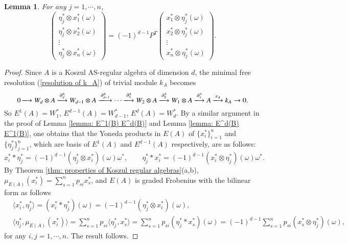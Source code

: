 \documentclass[a4paper,10pt]{amsart}
\newtheorem{lemma}[theorem]{Lemma}
\theoremstyle{definition}
\numberwithin{equation}{section}
\begin{document}
\begin{lemma}\label{lemma: Yoneda product in E(A)}
For any $j=1,\cdots,n$,
$$
\left(
\begin{array}{c}
\eta_j^*\otimes x^*_1(\omega)\\
\eta_j^*\otimes x^*_2(\omega)\\
\vdots\\
\eta_j^*\otimes x^*_n(\omega)
\end{array}
\right)
=(-1)^{d-1}P^T\left(
\begin{array}{c}
 x^*_1\otimes\eta^*_j(\omega)\\
x^*_2\otimes\eta^*_j(\omega)\\
\vdots\\
x^*_n\otimes\eta^*_j(\omega)
\end{array}
\right).
$$
\end{lemma}
\begin{proof}Since $A$ is a Koszul AS-regular algebra of dimension $d$, the minimal free  resolution (\ref{resolution of k_A}) of trivial module $k_A$ becomes
$$
0\xlongrightarrow{}W_d\otimes A\xlongrightarrow{\partial^A_d}W_{d-1}\otimes A\xlongrightarrow{\partial^A_{d-1}}\cdots\xlongrightarrow{\partial^A_{3}}W_2\otimes A\xlongrightarrow{\partial^A_{2}}W_1\otimes A\xlongrightarrow{\partial^A_{1}}A\xlongrightarrow{\varepsilon_A}k_A\to0.
$$
So $E^1(A)=W_1^*$, $E^{d-1}(A)=W_{d-1}^*$, $E^{d}(A)=W_{d}^*$.  By a similar argument in the proof of Lemma \ref{lemma: E^1(B) E^d(B)} and Lemma \ref{lemma: E^d(B) E^1(B)}, one obtains that the Yoneda products in $E(A)$ of $\{x_i^*\}_{i=1}^{n}$ and $\{\eta_{j}^*\}_{j=1}^n$, which are basis of $E^1(A)$ and $E^{d-1}(A)$ respectively, are as follows:
$$
x_i^*\ast \eta_j^*= (-1)^{d-1}(\eta_j^*\otimes x_i^*)(\omega)\omega^*,\qquad \eta_j^*\ast x_i^*=(-1)^{d-1}(x_i^*\otimes\eta^*_j)(\omega)\omega^*.
$$
By  Theorem  \ref{thm: properties of Koszul regular algebras}(a,b), $\mu_{E(A)}(x_i^*)=\sum_{s=1}^{n}p_{si}x_s^*$, and $E(A)$ is graded Frobenius with the bilinear form as follows
\begin{align*}
&\langle x_i^*, \eta_j^*\rangle=(x_i^*\ast \eta_j^*)(\omega)=(-1)^{d-1}(\eta_j^*\otimes x^*_i)(\omega),\\
&\langle \eta_j^*, \mu_{E(A)}(x_i^*)\rangle=\sum_{s=1}^{n}p_{si}\langle \eta_j^*, x_s^*\rangle=\sum_{s=1}^{n}p_{si}(\eta_j^*\ast x_s^*)(\omega)=(-1)^{d-1}\sum_{s=1}^{n}p_{si}(x_s^*\otimes\eta^*_j)(\omega),
\end{align*}
for any $i,j=1,\cdots,n$. The result follows.
\end{proof}
\end{document}
